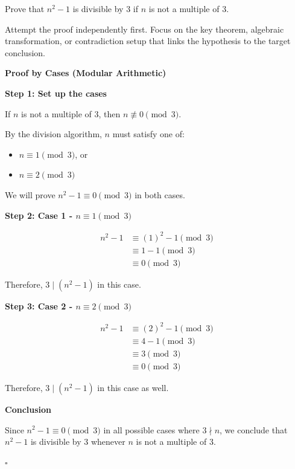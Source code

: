 
\begin{problem}
Prove that $n^2 - 1$ is divisible by 3 if $n$ is not a multiple of 3.
\end{problem}

\begin{hint}
Attempt the proof independently first. Focus on the key theorem, algebraic transformation, or contradiction setup that links the hypothesis to the target conclusion.
\end{hint}

\begin{solution}
\textbf{Proof by Cases (Modular Arithmetic)}

\textbf{Step 1: Set up the cases}

If $n$ is not a multiple of 3, then $n \not\equiv 0 \pmod{3}$.

By the division algorithm, $n$ must satisfy one of:
\begin{itemize}
    \item $n \equiv 1 \pmod{3}$, or
    \item $n \equiv 2 \pmod{3}$
\end{itemize}

We will prove $n^2 - 1 \equiv 0 \pmod{3}$ in both cases.

\textbf{Step 2: Case 1 - $n \equiv 1 \pmod{3}$}

\begin{align*}
    n^2 - 1 &\equiv (1)^2 - 1 \pmod{3} \\
    &\equiv 1 - 1 \pmod{3} \\
    &\equiv 0 \pmod{3}
\end{align*}

Therefore, $3 \mid (n^2 - 1)$ in this case.

\textbf{Step 3: Case 2 - $n \equiv 2 \pmod{3}$}

\begin{align*}
    n^2 - 1 &\equiv (2)^2 - 1 \pmod{3} \\
    &\equiv 4 - 1 \pmod{3} \\
    &\equiv 3 \pmod{3} \\
    &\equiv 0 \pmod{3}
\end{align*}

Therefore, $3 \mid (n^2 - 1)$ in this case as well.

\textbf{Conclusion}

Since $n^2 - 1 \equiv 0 \pmod{3}$ in all possible cases where $3 \nmid n$, we conclude that $n^2 - 1$ is divisible by 3 whenever $n$ is not a multiple of 3.

\hfill $\square$
\end{solution}


